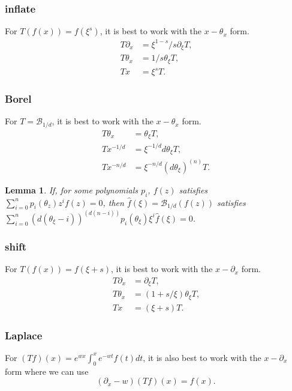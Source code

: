 \documentclass[12pt]{article}
\newcommand{\ee}[0] {e}
\numberwithin{equation}{section}
\newtheorem{lemma}[theorem]{Lemma}
\begin{document}
\subsubsection{inflate}
For $T(f(x)) = f(\xi^s)$, it is best to work with the $x-\theta_x$ form.
\begin{align*}
T \partial_x &= \xi^{1-s}/s \partial_{\xi} T\text{,}\\
T \theta_x &= 1/s \theta_{\xi} T \text{,}\\
T x &= \xi^s T\text{.}
\end{align*}

\subsubsection{Borel}
For $T=\mathcal{B}_{1/d}$, it is best to work with the $x-\theta_x$ form.
\begin{align*}
T \theta_x &= \theta_{\xi} T\text{,}\\
T x^{-1/d} &= \xi^{-1/d} d \theta_{\xi} T \text{,}\\
T x^{-n/d} &= 
\xi^{-n/d} (d \theta_\xi)^{(n)} T\text{.}
\end{align*}

\begin{lemma}
If, for some polynomials $p_i$, $f(z)$ satisfies $\sum_{i=0}^{n} p_i(\theta_z) z^i f(z) = 0$,
then $\hat{f}(\xi) = \mathcal{B}_{1/d}(f(z))$ satisfies $\sum_{i=0}^{n}(d (\theta_{\xi}-i))^{(d(n-i))} p_i(\theta_{\xi}) \xi^i \hat{f}(\xi) = 0$.
\end{lemma}


\subsubsection{shift}
For $T(f(x)) = f(\xi+s)$, it is best to work with the $x-\partial_x$ form.
\begin{align*}
T \partial_x &= \partial_{\xi} T\text{,}\\
T \theta_x &= (1+s/\xi) \theta_{\xi} T \text{,}\\
T x &= (\xi+s) T\text{.}
\end{align*}

\subsubsection{Laplace}
For $(Tf)(x) = \ee^{w x}\int_{0}^{x} \ee^{-w t} f(t) dt$, it is also best to work with the $x-\partial_x$ form where we can use
\begin{equation*}
(\partial_{x}- w) (Tf)(x) = f(x)\text{.}
\end{equation*}
\end{document}
